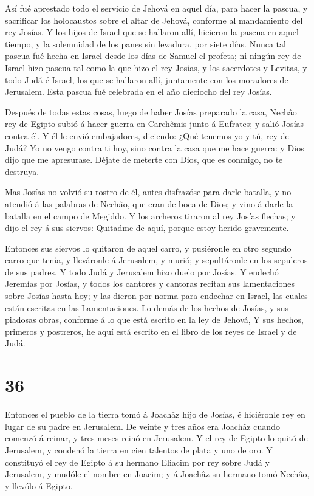  Así fué aprestado todo el servicio de Jehová en aquel día,
para hacer la pascua, y sacrificar los holocaustos sobre el altar de
Jehová, conforme al mandamiento del rey Josías.  Y los
hijos de Israel que se hallaron allí, hicieron la pascua en aquel
tiempo, y la solemnidad de los panes sin levadura, por siete días.
 Nunca tal pascua fué hecha en Israel desde los días de
Samuel el profeta; ni ningún rey de Israel hizo pascua tal como la que
hizo el rey Josías, y los sacerdotes y Levitas, y todo Judá é Israel,
los que se hallaron allí, juntamente con los moradores de Jerusalem.
 Esta pascua fué celebrada en el año dieciocho del rey
Josías.

 Después de todas estas cosas, luego de haber Josías
preparado la casa, Nechâo rey de Egipto subió á hacer guerra en
Carchêmis junto á Eufrates; y salió Josías contra él.  Y él
le envió embajadores, diciendo: ¿Qué tenemos yo y tú, rey de Judá? Yo no
vengo contra ti hoy, sino contra la casa que me hace guerra: y Dios dijo
que me apresurase. Déjate de meterte con Dios, que es conmigo, no te
destruya.

 Mas Josías no volvió su rostro de él, antes disfrazóse
para darle batalla, y no atendió á las palabras de Nechâo, que eran de
boca de Dios; y vino á darle la batalla en el campo de Megiddo.
 Y los archeros tiraron al rey Josías flechas; y dijo el
rey á sus siervos: Quitadme de aquí, porque estoy herido gravemente.

 Entonces sus siervos lo quitaron de aquel carro, y
pusiéronle en otro segundo carro que tenía, y lleváronle á Jerusalem, y
murió; y sepultáronle en los sepulcros de sus padres. Y todo Judá y
Jerusalem hizo duelo por Josías.  Y endechó Jeremías por
Josías, y todos los cantores y cantoras recitan sus lamentaciones sobre
Josías hasta hoy; y las dieron por norma para endechar en Israel, las
cuales están escritas en las Lamentaciones.  Lo demás de
los hechos de Josías, y sus piadosas obras, conforme á lo que está
escrito en la ley de Jehová,  Y sus hechos, primeros y
postreros, he aquí está escrito en el libro de los reyes de Israel y de
Judá.

\hypertarget{section-35}{%
\section{36}\label{section-35}}

 Entonces el pueblo de la tierra tomó á Joachâz hijo de
Josías, é hiciéronle rey en lugar de su padre en Jerusalem. 
De veinte y tres años era Joachâz cuando comenzó á reinar, y tres meses
reinó en Jerusalem.  Y el rey de Egipto lo quitó de
Jerusalem, y condenó la tierra en cien talentos de plata y uno de oro.
 Y constituyó el rey de Egipto á su hermano Eliacim por rey
sobre Judá y Jerusalem, y mudóle el nombre en Joacim; y á Joachâz su
hermano tomó Nechâo, y llevólo á Egipto.

